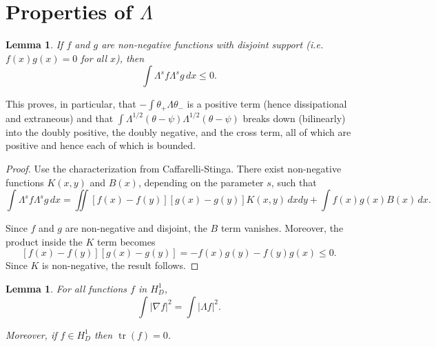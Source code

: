 \documentclass[11pt]{amsart}
\newtheorem{lemma}[theorem]{Lemma}
\theoremstyle{remark}
\theoremstyle{definition}
\newcommand{\abs}[1]{\left\lvert #1 \right\rvert}
\DeclareMathOperator{\trace}{tr}
\newcommand{\grad}{\nabla}
\begin{document}
\section{Properties of $\Lambda$} \label{sec:lemmas}

\begin{lemma} \label{thm:disjoint}
If $f$ and $g$ are non-negative functions with disjoint support (i.e. $f(x)g(x) = 0$ for all $x$), then 
\[ \int \Lambda^s f \Lambda^s g \,dx \leq 0. \]
\end{lemma}

This proves, in particular, that $-\int \theta_+ \Lambda \theta_-$ is a positive term (hence dissipational and extraneous) and that $\int \Lambda^{1/2} (\theta-\psi) \Lambda^{1/2} (\theta-\psi)$ breaks down (bilinearly) into the doubly positive, the doubly negative, and the cross term, all of which are positive and hence each of which is bounded.  

\begin{proof}
Use the characterization from Caffarelli-Stinga.  There exist non-negative functions $K(x,y)$ and $B(x)$, depending on the parameter $s$, such that
\[ \int \Lambda^s f \Lambda^s g \,dx = \iint [f(x)-f(y)][g(x)-g(y)] K(x,y) \,dxdy + \int f(x) g(x) B(x) \,dx. \]

Since $f$ and $g$ are non-negative and disjoint, the $B$ term vanishes.  Moreover, the product inside the $K$ term becomes
\[ [f(x)-f(y)][g(x)-g(y)] = -f(x)g(y)-f(y)g(x) \leq 0. \]
Since $K$ is non-negative, the result follows.  
\end{proof}

\begin{lemma}
For all functions $f$ in $H_D^1$,
\[ \int \abs{\grad f}^2 = \int \abs{\Lambda f}^2. \]

Moreover, if $f \in H_D^1$ then $\trace(f)=0$.  
\end{lemma}
\end{document}
